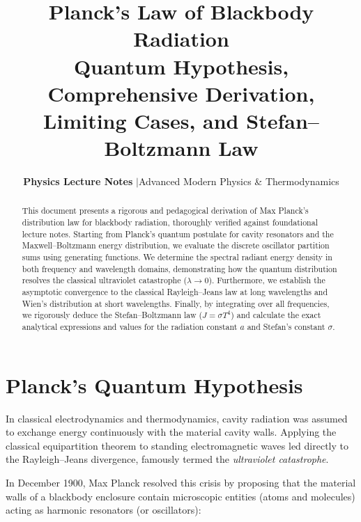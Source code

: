\documentclass[11pt,a4paper]{article}
\title{
    \vspace{-1.5cm}
    {\color{primarynavy}\Huge\bfseries Planck's Law of Blackbody Radiation}\\[0.35em]
    {\Large\color{darkslate} Quantum Hypothesis, Comprehensive Derivation, Limiting Cases, and Stefan--Boltzmann Law}
}
\author{\textbf{Physics Lecture Notes} \quad$\vert$\quad Advanced Modern Physics \& Thermodynamics}
\date{}
\begin{document}
\maketitle
\thispagestyle{plain}

\begin{abstract}
\noindent
This document presents a rigorous and pedagogical derivation of Max Planck's distribution law for blackbody radiation, thoroughly verified against foundational lecture notes. Starting from Planck's quantum postulate for cavity resonators and the Maxwell--Boltzmann energy distribution, we evaluate the discrete oscillator partition sums using generating functions. We determine the spectral radiant energy density in both frequency and wavelength domains, demonstrating how the quantum distribution resolves the classical ultraviolet catastrophe ($\lambda \to 0$). Furthermore, we establish the asymptotic convergence to the classical Rayleigh--Jeans law at long wavelengths and Wien's distribution at short wavelengths. Finally, by integrating over all frequencies, we rigorously deduce the Stefan--Boltzmann law ($J = \sigma T^4$) and calculate the exact analytical expressions and values for the radiation constant $a$ and Stefan's constant $\sigma$.
\end{abstract}

\vspace{0.5em}

\section{Planck's Quantum Hypothesis}

In classical electrodynamics and thermodynamics, cavity radiation was assumed to exchange energy continuously with the material cavity walls. Applying the classical equipartition theorem to standing electromagnetic waves led directly to the Rayleigh--Jeans divergence, famously termed the \textit{ultraviolet catastrophe}.

In December 1900, Max Planck resolved this crisis by proposing that the material walls of a blackbody enclosure contain microscopic entities (atoms and molecules) acting as harmonic resonators (or oscillators):
\end{document}
